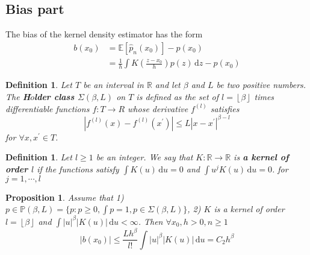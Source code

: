 \documentclass[10pt]{article}
\newtheorem{proposition}[prop]{Proposition}
\newtheorem{definition}[def]{Definition}
\newcommand{\Expect}[1]{\mathbb{E}\!\left[#1\right]}
\newcommand{\R}{\mathbb{R}}
\renewcommand{\hat}{\widehat}
\begin{document}
\subsection{Bias part}
The bias of the kernel density estimator has the form
\begin{align}
b(x_0) &= \Expect{\hat{p}_n(x_0)} - p(x_0)\\
&= \frac{1}{h} \int K(\frac{z-x_0}{h}) p(z) \, \mathrm{d}z - p(x_0)
\end{align}


\begin{definition}
Let $T$ be an interval in $\R$ and let $\beta$ and $L$ be two positive
numbers. The \textbf{H$\ddot{o}$lder class $\Sigma(\beta, L)$} on $T$ is defined as the set of 
$ l = \left \lfloor \beta \right \rfloor$
times differentiable functions $f : T \to R$ whose derivative $f^{(l)}$ satisfies
\begin{equation}
|f^{(l)}(x) - f^{(l)}(x^\prime)| \le L |x - x^\prime|^{\beta - l}
\end{equation}
for $\forall x, x^\prime \in T$.
\end{definition}


\begin{definition}
Let  $l \ge 1$ be an integer. We say that $K : \R \to \R$ is \textbf{a kernel of order $l$} if the functions 
satisfy $ \int K(u) \, \mathrm{d}u = 0$
and 
$ \int u^j K(u) \, \mathrm{d}u = 0$.
for $j=1, \cdots, l$
\end{definition}

\begin{proposition}\label{prop:bias}
Assume that 1) $p \in \mathbb{P}(\beta, L) = \{p : p \ge 0, \int p = 1, p \in \Sigma(\beta, L)\}$,
2) $K$ is a kernel of order $l = \left \lfloor \beta \right \rfloor$ and $ \int |u|^{\beta} |K(u)| \, \mathrm{d}u < \infty$.
Then $\forall x_0, h>0, n \ge 1$
\begin{equation}
|b(x_0)| \le \frac{Lh^\beta}{l !} \int |u|^{\beta} |K(u)| \, \mathrm{d}u = C_2 h^\beta
\end{equation}
\end{proposition}
\end{document}
